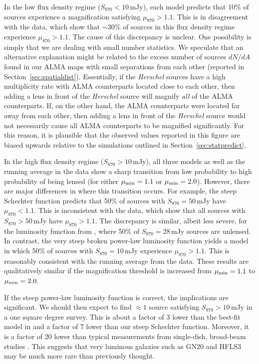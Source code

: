 \documentclass[iop]{emulateapj}
\begin{document}
In the low flux density regime ($S_{870} < 10\,$mJy), each model predicts that
10\% of sources experience a magnification satisfying $\mu_{870} > 1.1$.  This
is in disagreement with the data, which show that $\sim 30\%$ of sources in
this flux density regime experience $\mu_{870} > 1.1$.  The cause of this
discrepancy is unclear.  One possibility is simply that we are dealing with
small number statistics.  We speculate that an alternative explanation might be
related to the excess number of sources $dN/dA$ found in our ALMA maps with
small separations from each other (reported in Section~\ref{sec:spatialdist}).
Essentially, if the {\it Herschel} sources have a high multiplicity rate with
ALMA counterparts located close to each other, then adding a lens in front of
the {\it Herschel} source will magnify {\it all} of the ALMA counterparts.  If,
on the other hand, the ALMA counterparts were located far away from each other,
then adding a lens in front of the {\it Herschel} source would not necessarily
cause all ALMA counterparts to be magnified significantly.  For this reason, it
is plausible that the observed values reported in this figure are biased
upwards relative to the simulations outlined in Section~\ref{sec:statpredict}.

In the high flux density regime ($S_{870} > 10\,$mJy), all
three models as well as the running average in the data show a sharp transition
from low probability to high probability of being lensed (for either $\mu_{\rm
min} = 1.1$ or $\mu_{\rm min} = 2.0$).  However, there are major differences in
where this transition occurs.  For example, the steep Schechter function
predicts that 50\% of sources with $S_{870} = 50\,$mJy have $\mu_{870} < 1.1$.
This is inconsistent with the data, which show that all sources with $S_{870} >
50\,$mJy have $\mu_{870} > 1.1$.  The discrepancy is similar, albeit less
severe, for the luminosity function from \citet{Karim:2013lr}, where 50\% of
$S_{870} = 28\,$mJy sources are unlensed.  In contrast, the very steep broken
power-law luminosity function yields a model in which 50\% of sources with
$S_{870} = 10\,$mJy experience $\mu_{870} > 1.1$.  This is reasonably
consistent with the running average from the data.  These results are
qualitatively similar if the magnification threshold is increased from
$\mu_{\rm min} = 1.1$ to $\mu_{\rm min} = 2.0$.

If the steep power-law luminosity function is correct, the implications are
significant.  We should then expect to find $\approx 1$ source satisfying
$S_{870} > 10\,$mJy in a one square degree survey.  This is about a factor of 3
lower than the best-fit model in \citet{Karim:2013lr} and a factor of 7 lower
than our steep Schechter function.  Moreover, it is a factor of 20 lower than
typical measurements from single-dish, broad-beam studies
\citep[e.g.,][]{Weis:2009ly}.  This suggests that very luminous galaxies such as
GN20 and HFLS3 may be much more rare than previously thought.
\end{document}
